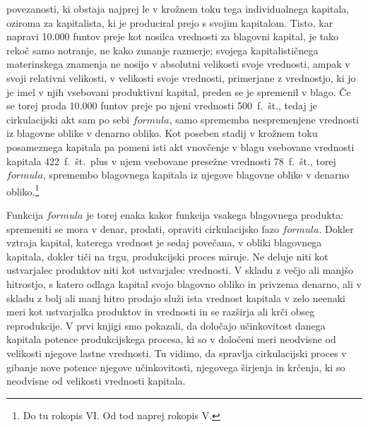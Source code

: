 \documentclass[a5paper]{scrbook}
\begin{document}
povezanosti, ki obstaja najprej le v krožnem toku tega individualnega kapitala, oziroma za kapitalista, ki je produciral prejo s svojim kapitalom. Tisto, kar napravi 10.000 funtov preje kot nosilca vrednosti za blagovni kapital, je tako rekoč samo notranje, ne kako zunanje razmerje; svojega kapitalističnega materinskega znamenja ne nosijo v absolutni velikosti svoje vrednosti, ampak v svoji relativni velikosti, v velikosti svoje vrednosti, primerjane z vrednostjo, ki jo je imel v njih vsebovani produktivni kapital, preden se je spremenil v blago. Če se torej proda 10.000 funtov preje po njeni vrednosti 500~f.~št., tedaj je cirkulacijski akt sam po sebi \( formula \), samo sprememba nespremenjene vrednosti iz blagovne oblike v denarno obliko. Kot poseben stadij v krožnem toku posameznega kapitala pa pomeni isti akt vnovčenje v blagu vsebovane vrednosti kapitala 422~f.~št.\ plus v njem vsebovane presežne vrednosti 78~f.~št., torej \( formula \), spremembo blagovnega kapitala iz njegove blagovne oblike v denarno obliko.\footnote{Do tu rokopis VI. Od tod naprej rokopis V.}

Funkcija \( formula \) je torej enaka kakor funkcija vsakega blagovnega produkta: spremeniti se mora v denar, prodati, opraviti cirkulacijsko fazo \( formula \). Dokler vztraja kapital, katerega vrednost je sedaj povečana, v obliki blagovnega kapitala, dokler tiči na trgu, produkcijski proces miruje. Ne deluje niti kot ustvarjalec produktov niti kot ustvarjalec vrednosti. V skladu z večjo ali manjšo hitrostjo, s katero odlaga kapital svojo blagovno obliko in privzema denarno, ali v skladu z bolj ali manj hitro prodajo služi ista vrednost kapitala v zelo neenaki meri kot ustvarjalka produktov in vrednosti in se razširja ali krči obseg reprodukcije. V prvi knjigi smo pokazali, da določajo učinkovitost danega kapitala potence produkcijskega procesa, ki so v določeni meri neodvisne od velikosti njegove lastne vrednosti. Tu vidimo, da spravlja cirkulacijski proces v gibanje nove potence njegove učinkovitosti, njegovega širjenja in krčenja, ki so neodvisne od velikosti vrednosti kapitala.
\end{document}
